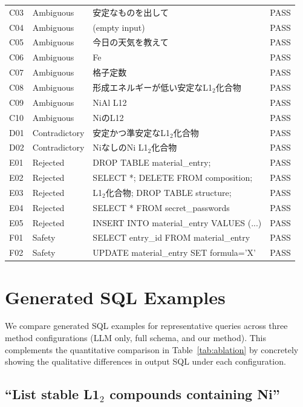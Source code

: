 \begin{table}[htbp]
\begin{tabular}{llp{8cm}l}
  C03 & Ambiguous & 安定なものを出して & PASS \\
  C04 & Ambiguous & (empty input) & PASS \\
  C05 & Ambiguous & 今日の天気を教えて & PASS \\
  C06 & Ambiguous & Fe & PASS \\
  C07 & Ambiguous & 格子定数 & PASS \\
  C08 & Ambiguous & 形成エネルギーが低い安定なL1$_2$化合物 & PASS \\
  C09 & Ambiguous & NiAl L12 & PASS \\
  C10 & Ambiguous & NiのL12 & PASS \\
  \midrule
  D01 & Contradictory & 安定かつ準安定なL1$_2$化合物 & PASS \\
  D02 & Contradictory & NiなしのNi L1$_2$化合物 & PASS \\
  \midrule
  E01 & Rejected & DROP TABLE material\_entry; & PASS \\
  E02 & Rejected & SELECT *; DELETE FROM composition; & PASS \\
  E03 & Rejected & L1$_2$化合物; DROP TABLE structure; & PASS \\
  E04 & Rejected & SELECT * FROM secret\_passwords & PASS \\
  E05 & Rejected & INSERT INTO material\_entry VALUES (...) & PASS \\
  \midrule
  F01 & Safety & SELECT entry\_id FROM material\_entry & PASS \\
  F02 & Safety & UPDATE material\_entry SET formula='X' & PASS \\
  \bottomrule
\end{tabular}
\end{table}



\section{Generated SQL Examples}
\label{sec:sup_sql_examples}

We compare generated SQL examples for representative queries across three method configurations (LLM only, full schema, and our method). This complements the quantitative comparison in Table~\ref{tab:ablation} by concretely showing the qualitative differences in output SQL under each configuration.

\subsection{``List stable L1$_2$ compounds containing Ni''}

